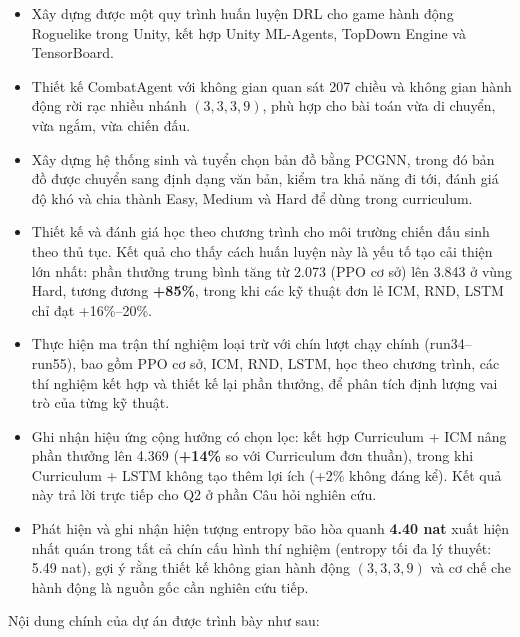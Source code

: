 \renewcommand{\labelitemi}{$-$}
\begin{itemize}
    \item Xây dựng được một quy trình huấn luyện DRL cho game hành động Roguelike trong Unity, kết hợp Unity ML-Agents, TopDown Engine và TensorBoard.
    \item Thiết kế CombatAgent với không gian quan sát 207 chiều và không gian hành động rời rạc nhiều nhánh $(3,3,3,9)$, phù hợp cho bài toán vừa di chuyển, vừa ngắm, vừa chiến đấu.
    \item Xây dựng hệ thống sinh và tuyển chọn bản đồ bằng PCGNN, trong đó bản đồ được chuyển sang định dạng văn bản, kiểm tra khả năng đi tới, đánh giá độ khó và chia thành Easy, Medium và Hard để dùng trong curriculum.
    \item Thiết kế và đánh giá học theo chương trình cho môi trường chiến đấu sinh theo thủ tục. Kết quả cho thấy cách huấn luyện này là yếu tố tạo cải thiện lớn nhất: phần thưởng trung bình tăng từ 2.073 (PPO cơ sở) lên 3.843 ở vùng Hard, tương đương \textbf{+85\%}, trong khi các kỹ thuật đơn lẻ ICM, RND, LSTM chỉ đạt +16\%--20\%.
    \item Thực hiện ma trận thí nghiệm loại trừ với chín lượt chạy chính (run34--run55), bao gồm PPO cơ sở, ICM, RND, LSTM, học theo chương trình, các thí nghiệm kết hợp và thiết kế lại phần thưởng, để phân tích định lượng vai trò của từng kỹ thuật.
    \item Ghi nhận hiệu ứng cộng hưởng có chọn lọc: kết hợp Curriculum + ICM nâng phần thưởng lên 4.369 (\textbf{+14\%} so với Curriculum đơn thuần), trong khi Curriculum + LSTM không tạo thêm lợi ích (+2\% không đáng kể). Kết quả này trả lời trực tiếp cho Q2 ở phần Câu hỏi nghiên cứu.
    \item Phát hiện và ghi nhận hiện tượng entropy bão hòa quanh \textbf{4.40 nat} xuất hiện nhất quán trong tất cả chín cấu hình thí nghiệm (entropy tối đa lý thuyết: 5.49 nat), gợi ý rằng thiết kế không gian hành động $(3,3,3,9)$ và cơ chế che hành động là nguồn gốc cần nghiên cứu tiếp.
\end{itemize}

\vspace{0.3cm}

\vspace{0.5cm}

Nội dung chính của dự án được trình bày như sau:

